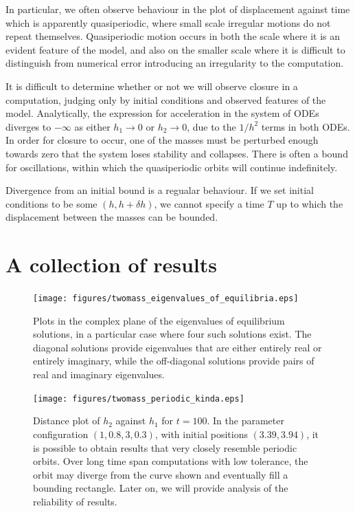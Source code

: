 In particular, we often observe behaviour in the plot of displacement against time which is apparently quasiperiodic,
where small scale irregular motions do not repeat themselves.
Quasiperiodic motion occurs in both the scale where it is an evident feature of the model,
and also on the smaller scale where it is difficult to distinguish from numerical error introducing an irregularity to the computation.

It is difficult to determine whether or not we will observe closure in a computation,
judging only by initial conditions and observed features of the model.
Analytically, the expression for acceleration in the system of ODEs diverges to $-\infty$ as either \(h_1\rightarrow 0\) or \(h_2 \rightarrow 0\),
due to the \(1/h^2\) terms in both ODEs.
In order for closure to occur,
one of the masses must be perturbed enough towards zero that the system loses stability and collapses.
There is often a bound for oscillations, within which the quasiperiodic orbits will continue indefinitely.

Divergence from an initial bound is a regualar behaviour.
If we set initial conditions to be some \((h,h+\delta h)\),
we cannot specify a time $T$ up to which the displacement between the masses can be bounded.

\section{A collection of results}

\begin{figure}[h!]
    \centering
    \texttt{[image: figures/twomass\_eigenvalues\_of\_equilibria.eps]}
    \caption{
        Plots in the complex plane of the eigenvalues of equilibrium solutions,
        in a particular case where four such solutions exist.
        The diagonal solutions provide eigenvalues that are either entirely real or entirely imaginary,
        while the off-diagonal solutions provide pairs of real and imaginary eigenvalues.
    }
    \label{fig:twomass_argand_eigenvalues}
\end{figure}

\begin{figure}[h!]
    \centering
    \texttt{[image: figures/twomass\_periodic\_kinda.eps]}
    \caption{
        Distance plot of $h_2$ against $h_1$ for $t=100$.
        In the parameter configuration \((1,0.8,3,0.3)\), with initial positions $(3.39,3.94)$,
        it is possible to obtain results that very closely resemble periodic orbits.
        Over long time span computations with low tolerance, the orbit may diverge from the curve shown and eventually fill a bounding rectangle. Later on, we will provide analysis of the reliability of results.
    }
    \label{fig:twomass_semiperiodic}
\end{figure}

